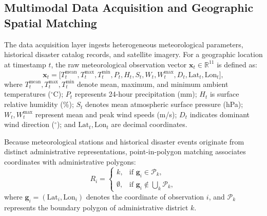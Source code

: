 \documentclass[conference]{IEEEtran}
\begin{document}
\subsection{Multimodal Data Acquisition and Geographic Spatial Matching}
The data acquisition layer ingests heterogeneous meteorological parameters, historical disaster catalog records, and satellite imagery. For a geographic location at timestamp $t$, the raw meteorological observation vector $\mathbf{x}_t \in \mathbb{R}^{11}$ is defined as:
\begin{equation}
\mathbf{x}_t = \big[ T^{\text{mean}}_t, T^{\text{max}}_t, T^{\text{min}}_t, P_t, H_t, S_t, W_t, W^{\text{max}}_t, D_t, \text{Lat}_t, \text{Lon}_t \big],
\label{eq:raw_weather}
\end{equation}
where $T^{\text{mean}}_t, T^{\text{max}}_t, T^{\text{min}}_t$ denote mean, maximum, and minimum ambient temperatures ($^\circ$C); $P_t$ represents 24-hour precipitation (mm); $H_t$ is surface relative humidity (\%); $S_t$ denotes mean atmospheric surface pressure (hPa); $W_t, W^{\text{max}}_t$ represent mean and peak wind speeds (m/s); $D_t$ indicates dominant wind direction ($^\circ$); and $\text{Lat}_t, \text{Lon}_t$ are decimal coordinates.

Because meteorological stations and historical disaster events originate from distinct administrative representations, point-in-polygon matching associates coordinates with administrative polygons:
\begin{equation}
R_i = \begin{cases}
k, & \text{if } \mathbf{g}_i \in \mathcal{P}_k, \\
\emptyset, & \text{if } \mathbf{g}_i \notin \bigcup_k \mathcal{P}_k,
\end{cases}
\label{eq:pip}
\end{equation}
where $\mathbf{g}_i = (\text{Lat}_i, \text{Lon}_i)$ denotes the coordinate of observation $i$, and $\mathcal{P}_k$ represents the boundary polygon of administrative district $k$.
\end{document}
